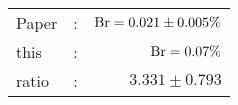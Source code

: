       \begin{tabular}{lcr}
          Paper &:& $\mathrm{Br}  = 0.021\pm 0.005\%$ \\
          this      &:& $\mathrm{Br}  = 0.07\%$ \\
		  ratio   &:& $3.331\pm 0.793$ \\
      \end{tabular}
